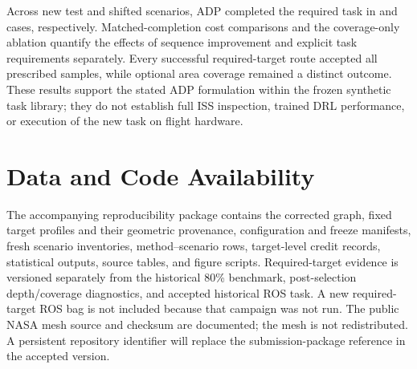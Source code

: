 Across \RTTestN{} new test and \RTOodN{} shifted scenarios, ADP completed the required task in \RTTestSuccess{} and \RTOodSuccess{} cases, respectively. Matched-completion cost comparisons and the coverage-only ablation quantify the effects of sequence improvement and explicit task requirements separately. Every successful required-target route accepted all prescribed samples, while optional area coverage remained a distinct outcome. These results support the stated ADP formulation within the frozen synthetic task library; they do not establish full ISS inspection, trained DRL performance, or execution of the new task on flight hardware.

\section*{Data and Code Availability}

The accompanying reproducibility package contains the corrected graph, fixed target profiles and their geometric provenance, configuration and freeze manifests, fresh scenario inventories, method--scenario rows, target-level credit records, statistical outputs, source tables, and figure scripts. Required-target evidence is versioned separately from the historical 80\% benchmark, post-selection depth/coverage diagnostics, and accepted historical ROS task. A new required-target ROS bag is not included because that campaign was not run. The public NASA mesh source and checksum are documented; the mesh is not redistributed. A persistent repository identifier will replace the submission-package reference in the accepted version.
